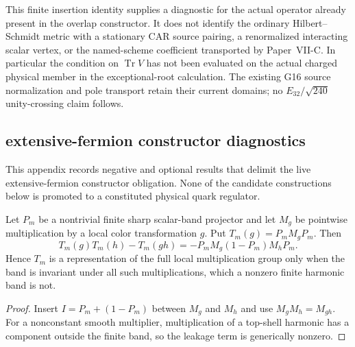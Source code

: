 \documentclass[12pt,a4paper]{article}
\begin{document}
This finite insertion identity supplies a diagnostic for the actual
operator already present in the overlap constructor. It does not
identify the ordinary Hilbert--Schmidt metric with a stationary CAR
source pairing, a renormalized interacting scalar vertex, or the
named-scheme coefficient transported by Paper~VII-C.
In particular the condition on \(\operatorname{Tr}V\) has not been
evaluated on the actual charged physical member in the exceptional-root
calculation. The existing G16 source normalization and pole transport
retain their current domains; no \(E_{32}/\sqrt{240}\) unity-crossing
claim follows.





\subsection{extensive-fermion constructor diagnostics}
\label{p10:app:v2180-xfe-diagnostics}

This appendix records negative and optional results that delimit the live
extensive-fermion constructor obligation.  None of the candidate constructions
below is promoted to a constituted physical quark regulator.

\begin{proposition}
\label{p10:prop:v2180-compressed-local-gauge-no-go}
Let $P_m$ be a nontrivial finite sharp scalar-band projector and let $M_g$ be
pointwise multiplication by a local color transformation $g$.  Put
$T_m(g)=P_mM_gP_m$.  Then
\[
 \boxed{T_m(g)T_m(h)-T_m(gh)
 =-P_mM_g(1-P_m)M_hP_m.}
\]
Hence $T_m$ is a representation of the full local multiplication group only
when the band is invariant under all such multiplications, which a nonzero
finite harmonic band is not.
\end{proposition}
\begin{proof}
Insert $I=P_m+(1-P_m)$ between $M_g$ and $M_h$ and use
$M_gM_h=M_{gh}$.  For a nonconstant smooth multiplier, multiplication of a
top-shell harmonic has a component outside the finite band, so the leakage
term is generically nonzero.
\end{proof}
\end{document}
